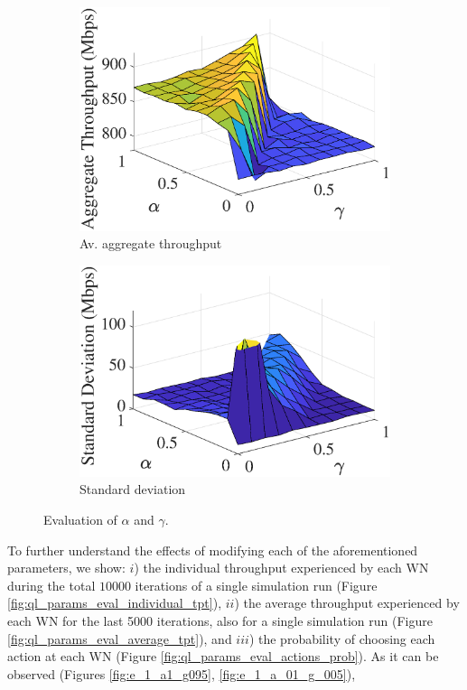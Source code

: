 \documentclass[conference]{IEEEtran}
\begin{document}
	\begin{figure}[t!]
		\centering
		\begin{subfigure}[(a)]{0.225\textwidth}
			\includegraphics[width=\textwidth]{images/alpha_vs_gamma_avg_tpt_sqrt_epsilon}
			\caption{Av. aggregate throughput}
			\label{fig:alpha_vs_gamma_avg_tpt_sqrt_epsilon}
		\end{subfigure}
		\begin{subfigure}[(b)]{0.225\textwidth}
			\includegraphics[width=\textwidth]{images/alpha_vs_gamma_std_sqrt_epsilon}
			\caption{Standard deviation}
			\label{fig:alpha_vs_gamma_std_sqrt_epsilon}
		\end{subfigure}
		\caption{Evaluation of $\alpha$ and $\gamma$.}
		\label{fig:ql_alpha_vs_gamma}
	\end{figure}
	To further understand the effects of modifying each of the aforementioned parameters, we show: $i$) the individual throughput experienced by each WN during the total $10000$ iterations of a single simulation run (Figure \ref{fig:ql_params_eval_individual_tpt}), $ii$) the average throughput experienced by each WN for the last 5000 iterations, also for a single simulation run (Figure \ref{fig:ql_params_eval_average_tpt}), and $iii$) the probability of choosing each action at each WN (Figure \ref{fig:ql_params_eval_actions_prob}). As it can be observed (Figures  \ref{fig:e_1_a1_g095}, \ref{fig:e_1_a_01_g_005}),
\end{document}
